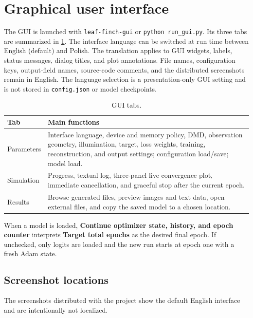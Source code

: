 \documentclass[11pt,a4paper]{article}
\begin{document}
\section{Graphical user interface}
The GUI is launched with \texttt{leaf-finch-gui} or \texttt{python run\_gui.py}. Its three tabs are summarized in \cref{tab:gui}. The interface language can be switched at run time between English (default) and Polish. The translation applies to GUI widgets, labels, status messages, dialog titles, and plot annotations. File names, configuration keys, output-field names, source-code comments, and the distributed screenshots remain in English. The language selection is a presentation-only GUI setting and is not stored in \texttt{config.json} or model checkpoints.
\begin{table}[H]
\centering
\caption{GUI tabs.}
\label{tab:gui}
\begin{tabularx}{\textwidth}{@{}lX@{}}
\toprule
Tab & Main functions \\
\midrule
Parameters & Interface language, device and memory policy, DMD, observation geometry, illumination, target, loss weights, training, reconstruction, and output settings; configuration load/save; model load. \\
Simulation & Progress, textual log, three-panel live convergence plot, immediate cancellation, and graceful stop after the current epoch. \\
Results & Browse generated files, preview images and text data, open external files, and copy the saved model to a chosen location. \\
\bottomrule
\end{tabularx}
\end{table}

When a model is loaded, \textbf{Continue optimizer state, history, and epoch counter} interprets \textbf{Target total epochs} as the desired final epoch. If unchecked, only logits are loaded and the new run starts at epoch one with a fresh Adam state.


\subsection{Screenshot locations}
The screenshots distributed with the project show the default English interface and are intentionally not localized.

\end{document}
